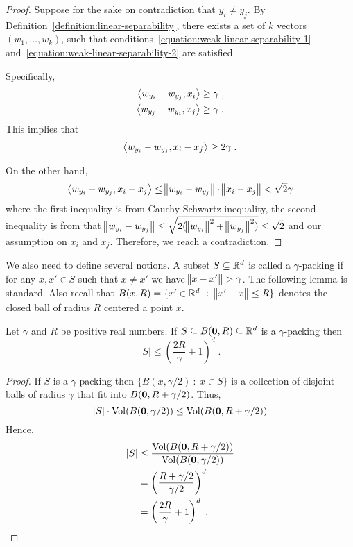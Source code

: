 \begin{proof}
Suppose for the sake on contradiction that $y_i \neq y_j$. By
Definition~\ref{definition:linear-separability}, there exists a set of $k$
vectors $(w_1, \ldots, w_k)$, such that
conditions~\eqref{equation:weak-linear-separability-1}
and~\eqref{equation:weak-linear-separability-2} are satisfied.

Specifically,
\begin{align*}
\left\langle w_{y_i} - w_{y_j}, x_i \right\rangle & \ge \gamma \; , \\
\left\langle w_{y_j} - w_{y_i}, x_j \right\rangle & \ge \gamma \; .
\end{align*}
This implies that
$$
\left\langle w_{y_i} - w_{y_j}, x_i - x_j \right\rangle \ge 2\gamma \; .
$$

On the other hand,
$$
\left\langle w_{y_i} - w_{y_j}, x_i - x_j \right\rangle \le \norm{w_{y_i} - w_{y_j}} \cdot \norm{x_i - x_j} < \sqrt{2} \gamma
$$
where the first inequality is from Cauchy-Schwartz inequality, the second
inequality is from that $\norm{w_{y_i} - w_{y_j}} \le \sqrt{2(\norm{w_{y_i}}^2 +
\norm{w_{y_j}}^2)} \leq \sqrt{2}$ and our assumption on $x_i$ and $x_j$.
Therefore, we reach a contradiction.
\end{proof}

We also need to define several notions. A subset $S \subseteq \mathbb{R}^d$ is called a
$\gamma$-packing if for any $x,x' \in S$ such that $x \neq x'$ we have $\norm{x -
x'} > \gamma$. The following lemma is standard. Also recall that $B(x,R) = \{ x'
\in \mathbb{R}^d ~:~ \norm{x' - x} \le R \}$ denotes the closed ball of radius $R$
centered a point $x$.

\begin{lemma}
\label{lemma:size-of-packing}
Let $\gamma$ and $R$ be positive real numbers.
If $S \subseteq B(\mathbf{0},R) \subseteq \mathbb{R}^d$ is a $\gamma$-packing then
$$
|S| \le \left( \frac{2R}{\gamma} + 1 \right)^d \; .
$$
\end{lemma}

\begin{proof}
If $S$ is a $\gamma$-packing then $\{ B(x,\gamma/2) ~:~ x \in S \}$
is a collection of disjoint balls of radius $\gamma$ that fit into $B(\mathbf{0},R + \gamma/2)$.
Thus,
$$
|S| \cdot \operatorname*{Vol}(B(\mathbf{0}, \gamma/2)) \le \operatorname*{Vol}(B(\mathbf{0},R + \gamma/2))
$$
Hence,
\begin{align*}
|S|
& \le \frac{\operatorname*{Vol}(B(\mathbf{0},R + \gamma/2))}{\operatorname*{Vol}(B(\mathbf{0}, \gamma/2))} \\
& = \left( \frac{R + \gamma/2}{\gamma/2} \right)^d \\
& = \left( \frac{2R}{\gamma} + 1 \right)^d \; .
\end{align*}
\end{proof}

